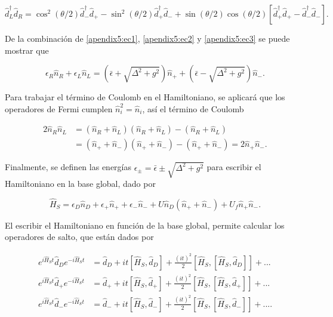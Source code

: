 \begin{appendixs}
\begin{equation}
    \hat{d}^{\dagger}_{L}\hat{d}_{R} = \cos^{2}(\theta/2)\hat{d}^{\dagger}_{-}\hat{d}_{+} - \sin^{2}(\theta/2) \hat{d}^{\dagger}_{+}\hat{d}_{-}  + \sin(\theta/2)\cos(\theta/2)[ \hat{d}^{\dagger}_{+}\hat{d}_{+} - \hat{d}^{\dagger}_{-}\hat{d}_{-} ].
    \label{apendix5:ec3}
\end{equation}

De la combinación de \ref{apendix5:ec1}, \ref{apendix5:ec2} y \ref{apendix5:ec3} se puede mostrar que 

\begin{equation*}
    \epsilon_{R} \hat{n}_{R} + \epsilon_{L} \hat{n}_{L} = (\bar{\epsilon} + \sqrt{\Delta^{2} + g^{2}})\hat{n}_{+} +  (\bar{\epsilon} - \sqrt{\Delta^{2} + g^{2}})\hat{n}_{-}.
\end{equation*}

Para trabajar el término de Coulomb en el Hamiltoniano, se aplicará que los operadores de Fermi cumplen $\hat{n}^{2}_{i} = \hat{n}_{i}$, así el término de Coulomb 

\begin{align*}
    2 \hat{n}_{R}\hat{n}_{L} & = (\hat{n}_{R} +\hat{n}_{L})(\hat{n}_{R} +\hat{n}_{L}) - (\hat{n}_{R} + \hat{n}_{L}) \\
    & = (\hat{n}_{+} +\hat{n}_{-})(\hat{n}_{+} +\hat{n}_{-}) - (\hat{n}_{+} + \hat{n}_{-})  = 2\hat{n}_{+}\hat{n}_{-}.
\end{align*}

Finalmente, se definen las energías $\epsilon_{\pm} = \bar{\epsilon} \pm \sqrt{\Delta^{2}+g^{2}}$ para escribir el Hamiltoniano en la base global, dado por 

\begin{equation}
    \hat{H}_{S} = \epsilon_{D}\hat{n}_{D} + \epsilon_{+}\hat{n}_{+} + \epsilon_{-}\hat{n}_{-} + U\hat{n}_{D}(\hat{n}_{+} + \hat{n}_{-}) + U_{f}\hat{n}_{+}\hat{n}_{-}.
    \label{apendix5:ec4}
\end{equation}

El escribir el Hamiltoniano en función de la base global, permite calcular los operadores de salto, que están dados por 

\begin{align*}
    e^{i \hat{H}_{S}t}\hat{d}_{D}e^{-i\hat{H}_{S}t} & = \hat{d}_{D} + it[\hat{H}_{S},\hat{d}_{D}] + \frac{(it)^{2}}{2} [\hat{H}_{S},[\hat{H}_{S},\hat{d}_{D}]] +... \\
    e^{i \hat{H}_{S}t}\hat{d}_{+}e^{-i\hat{H}_{S}t} & = \hat{d}_{+} + it[\hat{H}_{S},\hat{d}_{+}] + \frac{(it)^{2}}{2} [\hat{H}_{S},[\hat{H}_{S},\hat{d}_{+}]] +... \\
    e^{i \hat{H}_{S}t}\hat{d}_{-}e^{-i\hat{H}_{S}t} & = \hat{d}_{-} + it[\hat{H}_{S},\hat{d}_{-}] + \frac{(it)^{2}}{2} [\hat{H}_{S},[\hat{H}_{S},\hat{d}_{-}]] +....
\end{align*}


\end{appendixs}

